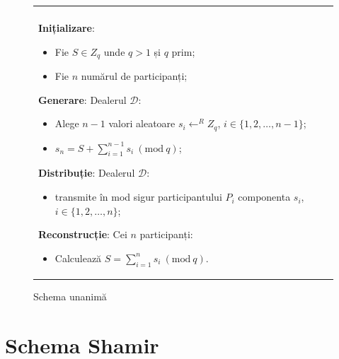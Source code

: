 \documentclass[oneside, 12pt]{book}
\newcommand{\Mod}[1]{\ (\text{mod}\ #1)}
\begin{document}
\begin{figure}[h!]

\begin{tabular}{|p{\textwidth}|}
\hline

\\
\hspace{.1in}
\textbf{Inițializare}: 
	\begin{itemize}
		\item Fie $S \in Z_q$ unde $q > 1 $ și $q$ prim;
		\item Fie $n$ numărul de participanți;
	\end{itemize}
\medskip

\hspace{.1in}
\textbf{Generare}: Dealerul $\mathcal{D}$:
	\begin{itemize}
		\setlength{\itemsep}{5pt}
		\item Alege $n - 1$ valori aleatoare $s_i \leftarrow^R Z_q$, $i \in \{1,2,\dots,{n-1}\}$;
		\item $s_n = S + \sum\limits_{i=1}^{n-1} s_i \Mod q $;
	\end{itemize}
\medskip

\hspace{.1in}
\textbf{Distribuție}: Dealerul $\mathcal{D}$:
	\begin{itemize}
		\item transmite în mod sigur participantului $P_i$ componenta $s_i$, $i \in \{1,2,\dots,n\}$;
	\end{itemize}

\hspace{.1in}
\textbf{Reconstrucție}: Cei $n$ participanți:
	\begin{itemize}
		\item Calculează $S = \sum\limits_{i=1}^{n} s_i \Mod q$.
	\end{itemize}

\\
\hline
\end{tabular}
\caption{Schema unanimă \cite{Karnin:83}}
\label{fig:all_or_nothing}
\end{figure}




\section{Schema Shamir}
\end{document}
